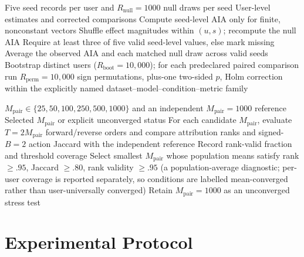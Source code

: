 \documentclass[pdflatex,sn-mathphys-num]{sn-jnl}
\theoremstyle{thmstyleone}
\theoremstyle{thmstyletwo}
\theoremstyle{thmstylethree}
\begin{document}
\begin{algorithm}[t]
\caption{Distinct-user inference and AIA null}
\label{alg:inference}
\begin{algorithmic}[1]
\Require Five seed records per user and $R_{\mathrm{null}}=1000$ null draws per seed
\Ensure User-level estimates and corrected comparisons
\State Compute seed-level AIA only for finite, nonconstant vectors
\State Shuffle effect magnitudes within $(u,s)$; recompute the null AIA
\EndFor
\EndFor
{}
\State Require at least three of five valid seed-level values, else mark missing
\State Average the observed AIA and each matched null draw across valid seeds
\EndFor
\State Bootstrap distinct users ($R_{\mathrm{boot}}=10{,}000$); for each predeclared paired comparison run $R_{\mathrm{perm}}=10{,}000$ sign permutations, plus-one two-sided $p$, Holm correction within the explicitly named dataset--model--condition--metric family
\end{algorithmic}
\end{algorithm}

\begin{algorithm}[t]
\caption{Independent convergence selection}
\label{alg:convergence}
\begin{algorithmic}[1]
\Require $M_{\mathrm{pair}}\in\{25,50,100,250,500,1000\}$ and an independent $M_{\mathrm{pair}}=1000$ reference
\Ensure Selected $M_{\mathrm{pair}}$ or explicit unconverged status
\State For each candidate $M_{\mathrm{pair}}$, evaluate $T=2M_{\mathrm{pair}}$ forward/reverse orders and compare attribution ranks and signed-$B=2$ action Jaccard with the independent reference
\State Record rank-valid fraction and threshold coverage
\EndFor
\State Select smallest $M_{\mathrm{pair}}$ whose population means satisfy rank $\ge.95$, Jaccard $\ge.80$, rank validity $\ge.95$ (a population-average diagnostic; per-user coverage is reported separately, so conditions are labelled mean-converged rather than user-universally converged)
\State Retain $M_{\mathrm{pair}}=1000$ as an unconverged stress test\EndIf
\end{algorithmic}
\end{algorithm}

\section{Experimental Protocol}
\end{document}
